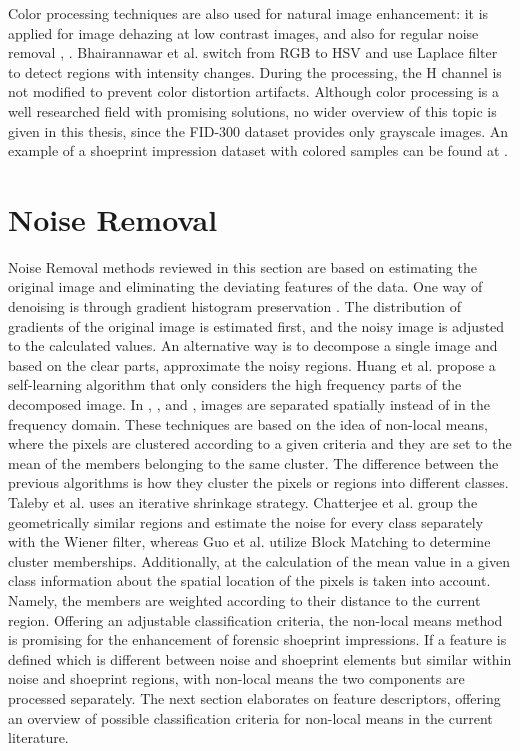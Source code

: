\documentclass[draft,final]{vutinfth} %
\begin{document}
\par
Color processing techniques are also used for natural image enhancement: it is applied for image dehazing at low contrast images, \cite{singh2018dehazing} and also for regular noise removal \cite{ren2018joint}, \cite{zhang2016simultaneous}. 
Bhairannawar et al. \cite{bhairannawar2017color} switch from RGB to HSV and use Laplace filter to detect regions with intensity changes. 
During the processing, the H channel is not modified to prevent color distortion artifacts.
Although color processing is a well researched field with promising solutions, no wider overview of this topic is given in this thesis, since the FID-300 dataset provides only grayscale images. 
An example of a shoeprint impression dataset with colored samples can be found at \cite{katireddy2017novel}. 

\section{Noise Removal}

Noise Removal methods reviewed in this section are based on estimating the original image and eliminating the deviating features of the data.
One way of denoising is through gradient histogram preservation \cite{zuo2013texture}.
The distribution of gradients  of the original image is estimated first, and the noisy image is adjusted to the calculated values.
An alternative way is to decompose a single image and based on the clear parts, approximate the noisy regions.
Huang et al. \cite{huang2013self} propose a self-learning algorithm that only considers the high frequency parts of the decomposed image.
In \cite{xu2015patch}, \cite{talebi2013global}, \cite{chatterjee2011patch} and \cite{guo2015efficient}, images  are separated spatially instead of in the frequency domain.
These techniques are based on the idea of non-local means, where the pixels are clustered according to a given criteria and they are set to the mean of the members belonging to the same cluster.
The difference between the previous algorithms is how they cluster the pixels or regions into different classes.
Taleby et al. \cite{talebi2013global} uses an iterative shrinkage strategy. 
Chatterjee et al.  \cite{chatterjee2011patch} group the geometrically similar regions and estimate the noise for every class separately with the Wiener filter, whereas Guo et al. \cite{guo2015efficient} utilize Block Matching to determine cluster memberships. 
Additionally, at the calculation of the mean value in a given class information about the spatial location of the pixels is taken into account.
Namely, the members are weighted according to their distance to the current region.
Offering an adjustable classification criteria, the non-local means method is promising for the enhancement of forensic shoeprint impressions.
If a feature is defined which is different between noise and shoeprint elements but similar within noise and shoeprint regions, with non-local means the two components are processed separately.
The next section elaborates on feature descriptors, offering an overview of possible classification criteria for non-local means in the current literature.
\end{document}
